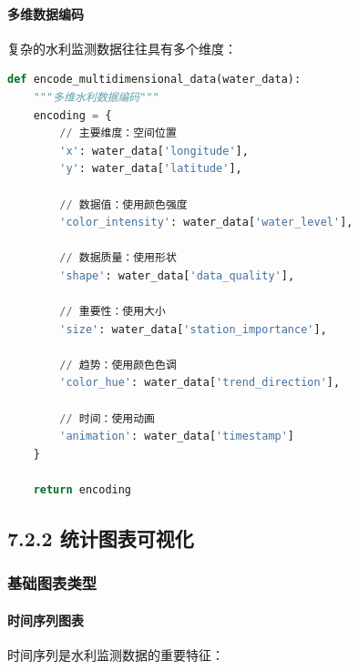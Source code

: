 \paragraph{多维数据编码}\label{ux591aux7ef4ux6570ux636eux7f16ux7801}

复杂的水利监测数据往往具有多个维度：

\begin{lstlisting}[language=Python]
def encode_multidimensional_data(water_data):
    """多维水利数据编码"""
    encoding = {
        // 主要维度：空间位置
        'x': water_data['longitude'],
        'y': water_data['latitude'],
        
        // 数据值：使用颜色强度
        'color_intensity': water_data['water_level'],
        
        // 数据质量：使用形状
        'shape': water_data['data_quality'],
        
        // 重要性：使用大小
        'size': water_data['station_importance'],
        
        // 趋势：使用颜色色调
        'color_hue': water_data['trend_direction'],
        
        // 时间：使用动画
        'animation': water_data['timestamp']
    }
    
    return encoding
\end{lstlisting}

\subsection{7.2.2
统计图表可视化}\label{ux7edfux8ba1ux56feux8868ux53efux89c6ux5316}

\subsubsection{基础图表类型}\label{ux57faux7840ux56feux8868ux7c7bux578b}

\paragraph{时间序列图表}\label{ux65f6ux95f4ux5e8fux5217ux56feux8868}

时间序列是水利监测数据的重要特征：

